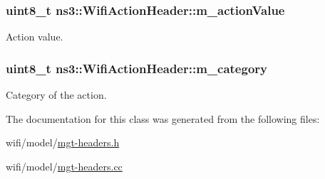 \subsubsection[{\texorpdfstring{m\+\_\+action\+Value}{m_actionValue}}]{\setlength{\rightskip}{0pt plus 5cm}uint8\+\_\+t ns3\+::\+Wifi\+Action\+Header\+::m\+\_\+action\+Value\hspace{0.3cm}{\ttfamily [private]}}\hypertarget{classns3_1_1WifiActionHeader_a632dce10add5a500d2e541b975b55702}{}\label{classns3_1_1WifiActionHeader_a632dce10add5a500d2e541b975b55702}


Action value. 

\subsubsection[{\texorpdfstring{m\+\_\+category}{m_category}}]{\setlength{\rightskip}{0pt plus 5cm}uint8\+\_\+t ns3\+::\+Wifi\+Action\+Header\+::m\+\_\+category\hspace{0.3cm}{\ttfamily [private]}}\hypertarget{classns3_1_1WifiActionHeader_a1e5b62e2dc8a7ad8edc62d56a2cdd866}{}\label{classns3_1_1WifiActionHeader_a1e5b62e2dc8a7ad8edc62d56a2cdd866}


Category of the action. 



The documentation for this class was generated from the following files\+:\begin{DoxyCompactItemize}
\item 
wifi/model/\hyperlink{mgt-headers_8h}{mgt-\/headers.\+h}\item 
wifi/model/\hyperlink{mgt-headers_8cc}{mgt-\/headers.\+cc}\end{DoxyCompactItemize}
